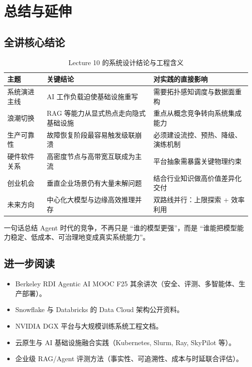\section{总结与延伸}

\subsection{全讲核心结论}
\begin{table}[H]
\centering
\begin{tabular}{p{3.0cm}p{4.0cm}p{4.4cm}}
\toprule
\textbf{主题} & \textbf{关键结论} & \textbf{对实践的直接影响} \\
\midrule
系统演进主线 & AI 工作负载迫使基础设施重写 & 需要拓扑感知调度与数据面重构 \\
浪潮切换 & RAG 等能力从显式热点走向隐式基础设施 & 重点从概念竞争转向系统集成能力 \\
生产可靠性 & 故障恢复阶段最容易触发级联崩溃 & 必须建设流控、预热、降级、演练机制 \\
硬件软件关系 & 高密度节点与高带宽互联成为主流 & 平台抽象需暴露关键物理约束 \\
创业机会 & 垂直企业场景仍有大量未解问题 & 结合行业知识做高价值差异化交付 \\
未来方向 & 中心化大模型与边缘高效推理并存 & 双路线并行：上限探索 + 效率利用 \\
\bottomrule
\end{tabular}
\caption{Lecture 10 的系统设计结论与工程含义}
\end{table}

\begin{importantbox}{一句话总结}
Agent 时代的竞争，不再只是 ``谁的模型更强''，而是 ``谁能把模型能力稳定、低成本、可治理地变成真实系统能力''。
\end{importantbox}

\subsection{进一步阅读}
\begin{itemize}
    \item Berkeley RDI Agentic AI MOOC F25 其余讲次（安全、评测、多智能体、生产部署）。
    \item Snowflake 与 Databricks 的 Data Cloud 架构公开资料。
    \item NVIDIA DGX 平台与大规模训练系统工程文档。
    \item 云原生与 AI 基础设施融合实践（Kubernetes, Slurm, Ray, SkyPilot 等）。
    \item 企业级 RAG/Agent 评测方法（事实性、可追溯性、成本与时延联合评估）。
\end{itemize}


